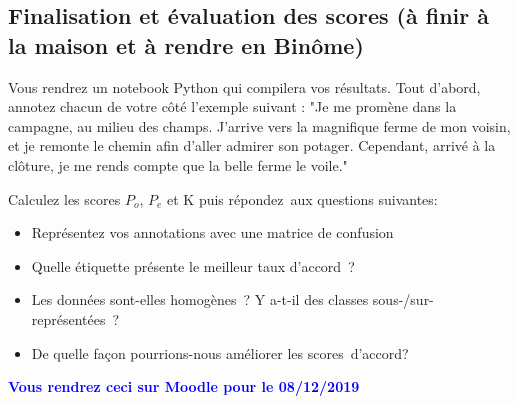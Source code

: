   \subsection{Finalisation et évaluation des scores (à finir à la maison et à rendre en Binôme)}
Vous rendrez un notebook Python qui compilera vos résultats. Tout d'abord, annotez chacun de votre côté l'exemple suivant :
 "Je me promène dans la campagne, au milieu des champs. J'arrive vers la magnifique ferme de mon voisin, et je remonte le chemin afin d'aller admirer son potager. Cependant, arrivé à la clôture, je me rends compte que la belle ferme le voile."

Calculez les scores $P_o$, $P_e$ et K puis répondez aux questions suivantes:
\begin{itemize}
  \item Représentez vos annotations avec une matrice de confusion
  \item Quelle étiquette présente le meilleur taux d'accord ?
  \item Les données sont-elles homogènes ? Y a-t-il des classes sous-/sur-représentées ?
  \item De quelle façon pourrions-nous améliorer les scores d'accord?
\end{itemize}

\textcolor{blue}{\textbf{Vous rendrez ceci sur Moodle pour le 08/12/2019}}

\noindent{}
